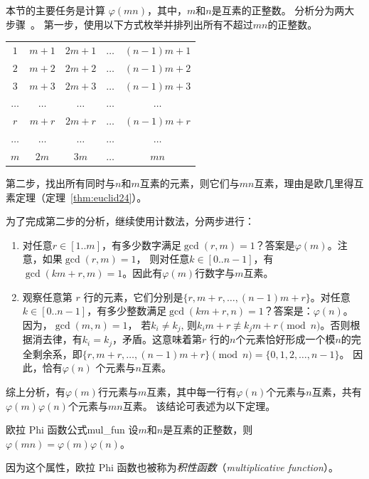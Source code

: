 本节的主要任务是计算 $\varphi(mn)$，其中，$m$和$n$是互素的正整数。 分析分为两大步骤~\cite{Ros11ENTA}。
第一步，使用以下方式枚举并排列出所有不超过$mn$的正整数。
\begin{center}
		\begin{tabular}{c c c c c}
		$1$ & $m+1$  & $2m+1$ & $\ldots$ & $(n-1)m+1$ \\
		$2$ & $m+2$ & $2m+2$ & $\ldots$ & $(n-1)m+2$ \\
		$3$ & $m+3$ & $2m+3$ & $\ldots$& $(n-1)m+3$ \\
		$\ldots$ & $\ldots$ & $\ldots$ & $\ldots$ & $\ldots$ \\
		$r$ & $m+r$ & $2m+r$ & $\ldots$  &$(n-1)m+r$  \\
		$\ldots$&  $\ldots$ & $\ldots$ & $\ldots$ & $\ldots$ \\
		$m$ & $2m$ & $3m$  & $\ldots$ & $mn$ \\
		\end{tabular}
\end{center}

第二步，找出所有同时与$n$和$m$互素的元素，则它们与$mn$互素，理由是欧几里得互素定理（定理~\ref{thm:euclid24}）。

为了完成第二步的分析，继续使用计数法，分两步进行：
\begin{enumerate}
	\item 对任意$r \in [1.. m]$，有多少数字满足$\gcd(r, m) =1$？答案是$\varphi(m)$。注意，如果$\gcd(r,m) =1$，
	则对任意$k \in [0..n-1]$，有$\gcd(km + r, m) =1$。因此有$\varphi(m)$行数字与$m$互素。

	\item 观察任意第 $r$ 行的元素，它们分别是$\{r, m + r, \ldots, (n-1)m + r\}$。对任意$k \in [0..n-1]$，有多少整数满足$\gcd(km + r, n)=1$？答案是：$\varphi(n)$。 因为，$\gcd(m, n) = 1$，
	若$k_i \neq k_j$, 则$k_i m + r \not \equiv k_j m + r \pmod n$。否则根据消去律，有$k_i = k_j$，矛盾。这意味着第$r$
	行的$n$个元素恰好形成一个模$n$的完全剩余系，即$\{ r, m + r, \ldots, (n-1)m + r\} \pmod n = \{0, 1, 2, \ldots, n-1\}$。
	因此，恰有$\varphi(n)$ 个元素与$n$互素。
\end{enumerate}
综上分析，有$\varphi(m)$行元素与$m$互素，其中每一行有$\varphi(n)$个元素与$n$互素，共有$\varphi(m) \varphi(n)$个元素与$mn$互素。
该结论可表述为以下定理。

\begin{theorem}{欧拉 Phi 函数公式}{mul_fun}
	设$m$和$n$是互素的正整数，则$\varphi(mn) = \varphi(m) \varphi(n)$。
\end{theorem}
因为这个属性，欧拉 Phi 函数也被称为\emph{积性函数}（\emph{multiplicative function}）。

